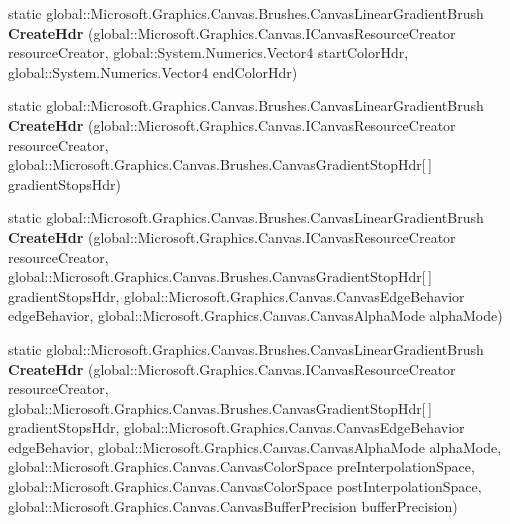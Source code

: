 \begin{DoxyCompactItemize}
static global\+::\+Microsoft.\+Graphics.\+Canvas.\+Brushes.\+Canvas\+Linear\+Gradient\+Brush {\bfseries Create\+Hdr} (global\+::\+Microsoft.\+Graphics.\+Canvas.\+I\+Canvas\+Resource\+Creator resource\+Creator, global\+::\+System.\+Numerics.\+Vector4 start\+Color\+Hdr, global\+::\+System.\+Numerics.\+Vector4 end\+Color\+Hdr)
\item 
\mbox{\label{class_microsoft_1_1_graphics_1_1_canvas_1_1_brushes_1_1_canvas_linear_gradient_brush_a5aac477d60f1a54fac610c89d85f7c46}} 
static global\+::\+Microsoft.\+Graphics.\+Canvas.\+Brushes.\+Canvas\+Linear\+Gradient\+Brush {\bfseries Create\+Hdr} (global\+::\+Microsoft.\+Graphics.\+Canvas.\+I\+Canvas\+Resource\+Creator resource\+Creator, global\+::\+Microsoft.\+Graphics.\+Canvas.\+Brushes.\+Canvas\+Gradient\+Stop\+Hdr\mbox{[}$\,$\mbox{]} gradient\+Stops\+Hdr)
\item 
\mbox{\label{class_microsoft_1_1_graphics_1_1_canvas_1_1_brushes_1_1_canvas_linear_gradient_brush_a1a0104bd1c67e8ce9f314d0238d4aca4}} 
static global\+::\+Microsoft.\+Graphics.\+Canvas.\+Brushes.\+Canvas\+Linear\+Gradient\+Brush {\bfseries Create\+Hdr} (global\+::\+Microsoft.\+Graphics.\+Canvas.\+I\+Canvas\+Resource\+Creator resource\+Creator, global\+::\+Microsoft.\+Graphics.\+Canvas.\+Brushes.\+Canvas\+Gradient\+Stop\+Hdr\mbox{[}$\,$\mbox{]} gradient\+Stops\+Hdr, global\+::\+Microsoft.\+Graphics.\+Canvas.\+Canvas\+Edge\+Behavior edge\+Behavior, global\+::\+Microsoft.\+Graphics.\+Canvas.\+Canvas\+Alpha\+Mode alpha\+Mode)
\item 
\mbox{\label{class_microsoft_1_1_graphics_1_1_canvas_1_1_brushes_1_1_canvas_linear_gradient_brush_a0c6d262a63d8d21f04c1bb8c01fb6ac4}} 
static global\+::\+Microsoft.\+Graphics.\+Canvas.\+Brushes.\+Canvas\+Linear\+Gradient\+Brush {\bfseries Create\+Hdr} (global\+::\+Microsoft.\+Graphics.\+Canvas.\+I\+Canvas\+Resource\+Creator resource\+Creator, global\+::\+Microsoft.\+Graphics.\+Canvas.\+Brushes.\+Canvas\+Gradient\+Stop\+Hdr\mbox{[}$\,$\mbox{]} gradient\+Stops\+Hdr, global\+::\+Microsoft.\+Graphics.\+Canvas.\+Canvas\+Edge\+Behavior edge\+Behavior, global\+::\+Microsoft.\+Graphics.\+Canvas.\+Canvas\+Alpha\+Mode alpha\+Mode, global\+::\+Microsoft.\+Graphics.\+Canvas.\+Canvas\+Color\+Space pre\+Interpolation\+Space, global\+::\+Microsoft.\+Graphics.\+Canvas.\+Canvas\+Color\+Space post\+Interpolation\+Space, global\+::\+Microsoft.\+Graphics.\+Canvas.\+Canvas\+Buffer\+Precision buffer\+Precision)

\end{DoxyCompactItemize}
